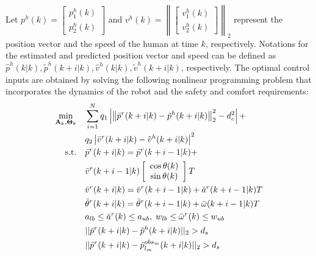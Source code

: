 \documentclass[letterpaper, 10 pt, conference]{ieeeconf}
\begin{document}
	Let $p^h(k)=
	\left[ 
	\begin{array}{c}
	p^h_1(k)\\
	p^h_2(k)
	\end{array}\right] $ and $v^h(k)=
	\left\|\left[ 
	\begin{array}{c}
	v^h_1(k)\\
	v^h_2(k)
	\end{array}\right]\right\|_2
	$ represent the position vector and the speed of the human at time $k$, respectively.
	Notations for the estimated and predicted position vector and speed can be defined as $\hat{p}^h(k|k),\tilde{p}^h(k+i|k),\hat{v}^h(k|k),\tilde{v}^h(k+i|k)$, respectively.
	The optimal control inputs are obtained by solving the following nonlinear programming problem that incorporates the dynamics of the robot and the safety and comfort requirements:
	\small	\begin{subequations}\label{eqn:path_plan_mpc}
		\begin{align}
			\min_{\mathbf{A}_k,\mathbf{\Theta}_k} \quad &\sum\limits_{i=1}^{N} q_1\left| \left\|\bar{p}^r(k+i|k)-\tilde{p}^h(k+i|k)\right\|^2_2-d^2_{c}\right| + \notag\\
			& q_2\left|\bar{v}^r(k+i|k)-\tilde{v}^h(k+i|k)\right|^2\label{eqn:obj}\\
			\text{s.t.} \quad & \bar{p}^r(k+i|k)=\bar{p}^r(k+i-1|k)+\notag\\
			&\bar{v}^r(k+i-1|k)
			\left[ 
			\begin{array}{c}
				\cos \theta(k)\\
				\sin \theta(k)\\
			\end{array}
			\right]T\label{eqn:constr:dyn_pre_motion}\\
			& \bar{v}^r(k+i|k)=\bar{v}^r(k+i-1|k)+\bar{a}^r(k+i-1|k)T\label{eqn:constr:dyn_pre_v}\\       &\bar{\theta}^r(k+i|k)=\bar{\theta}^r(k+i-1|k)+\bar{\omega}(k+i-1|k)T\label{eqn:constr:dyn_pre_theta}\\
			& a_{lb}\le \bar{a}^r(k)\le a_{ub},\;w_{lb}\le \bar{\omega}^r(k)\le w_{ub}\label{eqn:constr:aw}\\
			& ||\bar{p}^r(k+i|k)-\tilde{p}^h(k+i|k)||_2> d_s\label{eqn:constr:safety_human}\\
			& ||\bar{p}^r(k+i|k)-\tilde{p}^{obs_m}_{l_m}(k+i|k)||_2> d_s\label{eqn:constr:safety_mv_obs}\\

\end{align}
\end{subequations}
\end{document}
